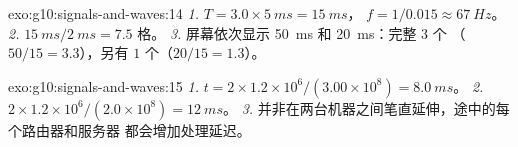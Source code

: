 \begin{solution}{exo:g10:signals-and-waves:14}
\emph{1.} $T = 3.0 \times \qty{5}{ms} = \qty{15}{ms}$，
$f = 1/0.015 \approx \qty{67}{Hz}$。
\emph{2.} $\qty{15}{ms}/\qty{2}{ms} = 7.5$ 格。
\emph{3.} 屏幕依次显示 \qty{50}{ms} 和 \qty{20}{ms}：完整 $3$ 个
（$50/15 = 3.3$），另有 $1$ 个（$20/15 = 1.3$）。
\end{solution}

\begin{solution}{exo:g10:signals-and-waves:15}
\emph{1.} $t = 2 \times 1.2\times10^{6}/(3.00\times10^{8}) =
\qty{8.0}{ms}$。
\emph{2.} $2 \times 1.2\times10^{6}/(2.0\times10^{8}) = \qty{12}{ms}$。
\emph{3.} 并非在两台机器之间笔直延伸，途中的每个路由器和服务器
都会增加处理延迟。
\end{solution}

